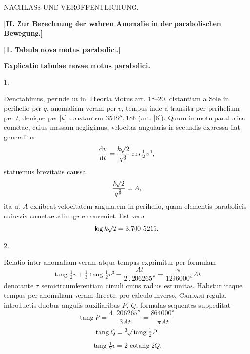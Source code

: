 \clearpage
{}
\begin{center}
{\large NACHLASS UND VERÖFFENTLICHUNG.\par}
\bigskip
{}
\textbf{[II. Zur Berechnung der wahren Anomalie in der parabolischen Bewegung.]}\par
\bigskip
{}
\textbf{[1. Tabula nova motus parabolici.]}\par
\medskip
\textbf{Explicatio tabulae novae motus parabolici.}
\end{center}
\medskip
{}
\begin{center}1.\end{center}
\noindent\hspace*{\parindent}Denotabimus, perinde ut in Theoria Motus art. 18–20, distantiam a Sole in perihelio per \(q\), anomaliam veram per \(v\), tempus inde a transitu per perihelium per \(t\), denique per [\(k\)] constantem \(3548''{,}188\) (art. [6]). Quum in motu parabolico cometae, cuius massam negligimus, velocitas angularis in secundis expressa fiat generaliter
\[
\frac{\mathrm{d}v}{\mathrm{d}t}=\frac{k\BareRoot{2}}{q^{\frac32}}\cos\tfrac12v^4,
\]
statuemus brevitatis caussa
\[
\frac{k\BareRoot{2}}{q^{\frac32}}=A,
\]
ita ut \(A\) exhibeat velocitatem angularem in perihelio, quam elementis parabolicis cuiusvis cometae adiungere conveniet. Est vero
\[
\log k\BareRoot{2}=3{,}700\ 5216.
\]
\par\medskip
{}
\begin{center}2.\end{center}
\noindent\hspace*{\parindent}Relatio inter anomaliam veram atque tempus exprimitur per formulam
\[
\operatorname{tang}\tfrac12v+\tfrac13\operatorname{tang}\tfrac12v^3
=\frac{At}{2\mathpunct{.}206265''}=\frac{\pi}{1296000''}At
\]
denotante \(\pi\) semicircumferentiam circuli cuius radius est unitas. Habetur itaque tempus per anomaliam veram directe; pro calculo inverso, \textsc{Cardan}i regula, introductis duobus angulis auxiliaribus \(P\), \(Q\), formulas sequentes suppeditat:
\[
\operatorname{tang}P=\frac{4\mathpunct{.}206265''}{3At}=\frac{864000''}{\pi At}
\]
\[
\operatorname{tang}Q=\BareRoot[3]{\operatorname{tang}\tfrac12P}
\]
\[
\operatorname{tang}\tfrac12v=2\operatorname{cotang}2Q.
\]
